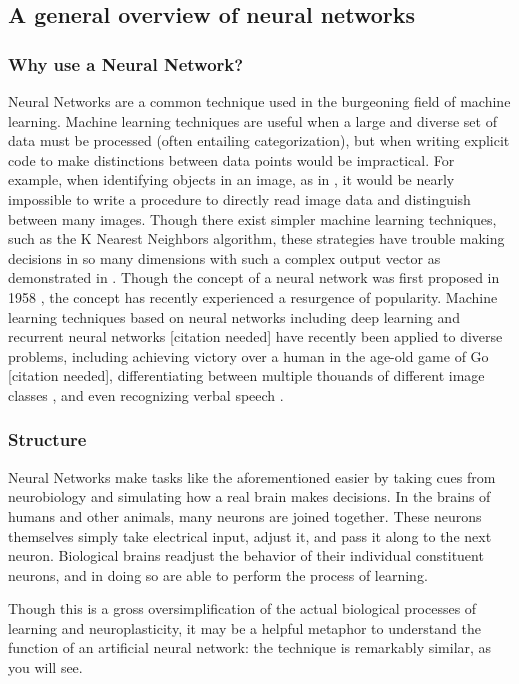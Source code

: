 \documentclass{article}
\begin{document}
\subsection{A general overview of neural networks}
\subsubsection{Why use a Neural Network?}
Neural Networks are a common technique used in the burgeoning field of machine learning. Machine learning techniques are useful when a large and diverse set of data must be processed (often entailing categorization), but when writing explicit code to make distinctions between data points would be impractical. For example, when identifying objects in an image, as in \cite{hinton12}, it would be nearly impossible to write a procedure to directly read image data and distinguish between many images. Though there exist simpler machine learning techniques, such as the K Nearest Neighbors algorithm, these strategies have trouble making decisions in so many dimensions with such a complex output vector as demonstrated in \cite{knnic}. Though the concept of a neural network was first proposed in 1958 \cite{rosenblatt58}, the concept has recently experienced a resurgence of popularity. Machine learning techniques based on neural networks including deep learning \cite{mitdeeplearning} and recurrent neural networks [citation needed] have recently been applied to diverse problems, including achieving victory over a human in the age-old game of Go [citation needed], differentiating between multiple thouands of different image classes \cite{hinton12}, and even recognizing verbal speech \cite{rnnspoken}.

\subsubsection{Structure}
Neural Networks make tasks like the aforementioned easier by taking cues from neurobiology and simulating how a real brain makes decisions. In the brains of humans and other animals, many neurons are joined together. These neurons themselves simply take electrical input, adjust it, and pass it along to the next neuron. Biological brains readjust the behavior of their individual constituent neurons, and in doing so are able to perform the process of learning.

Though this is a gross oversimplification of the actual biological processes of learning and neuroplasticity, it may be a helpful metaphor to understand the function of an artificial neural network: the technique is remarkably similar, as you will see.
\end{document}
